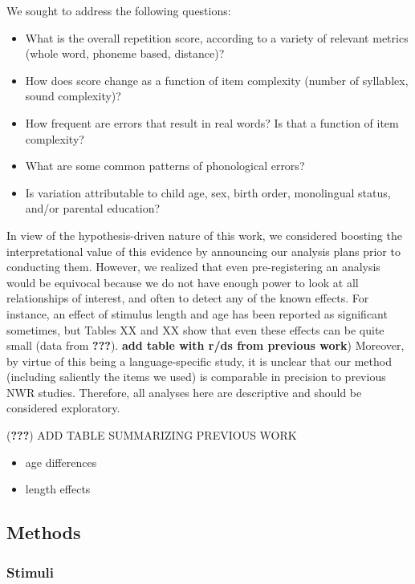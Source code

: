 \documentclass[english,,man,floatsintext]{apa6}
\providecommand{\tightlist}{%
  \setlength{\itemsep}{0pt}\setlength{\parskip}{0pt}}
\begin{document}
We sought to address the following questions:

\begin{itemize}
\tightlist
\item
  What is the overall repetition score, according to a variety of relevant metrics (whole word, phoneme based, distance)?
\item
  How does score change as a function of item complexity (number of syllablex, sound complexity)?
\item
  How frequent are errors that result in real words? Is that a function of item complexity?
\item
  What are some common patterns of phonological errors?
\item
  Is variation attributable to child age, sex, birth order, monolingual status, and/or parental education?
\end{itemize}

In view of the hypothesis-driven nature of this work, we considered boosting the interpretational value of this evidence by announcing our analysis plans prior to conducting them. However, we realized that even pre-registering an analysis would be equivocal because we do not have enough power to look at all relationships of interest, and often to detect any of the known effects. For instance, an effect of stimulus length and age has been reported as significant sometimes, but Tables XX and XX show that even these effects can be quite small (data from {\textbf{???}}). \textbf{add table with r/ds from previous work})
Moreover, by virtue of this being a language-specific study, it is unclear that our method (including saliently the items we used) is comparable in precision to previous NWR studies. Therefore, all analyses here are descriptive and should be considered exploratory.

({\textbf{???}}) ADD TABLE SUMMARIZING PREVIOUS WORK

\begin{itemize}
\tightlist
\item
  age differences
\item
  length effects
\end{itemize}

\hypertarget{methods}{%
\subsection{Methods}\label{methods}}

\hypertarget{stimuli}{%
\subsubsection{Stimuli}\label{stimuli}}
\end{document}
